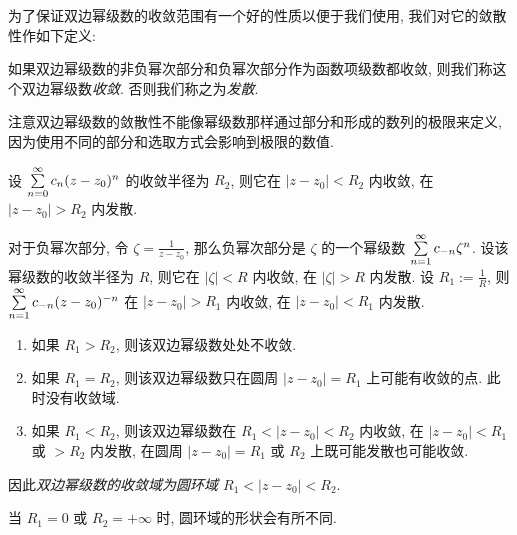 \documentclass[nocolor,theme=doremi,lang=cn,11pt,chinese,twoside,openright,usesamecnt]{elegantbook}
\begin{document}
为了保证双边幂级数的收敛范围有一个好的性质以便于我们使用, 我们对它的敛散性作如下定义:
\begin{definition}
	如果双边幂级数的非负幂次部分和负幂次部分作为函数项级数都收敛, 则我们称这个双边幂级数\emph{收敛}. 否则我们称之为\emph{发散}.
\end{definition}

注意双边幂级数的敛散性不能像幂级数那样通过部分和形成的数列的极限来定义,
因为使用不同的部分和选取方式会影响到极限的数值.

设 $\sum\limits_{n=0}^\infty c_n(z-z_0)^n$ 的收敛半径为 $R_2$, 则它在 $|z-z_0|<R_2$ 内收敛, 在 $|z-z_0|>R_2$ 内发散.

对于负幂次部分, 令 $\zeta=\frac1{z-z_0}$, 那么负幂次部分是 $\zeta$ 的一个幂级数 $\sum\limits_{n=1}^\infty c_{-n}\zeta^n$.
设该幂级数的收敛半径为 $R$, 则它在 $|\zeta|<R$ 内收敛, 在 $|\zeta|>R$ 内发散.
设 $R_1:=\frac1R$, 则 $\sum\limits_{n=1}^\infty c_{-n}(z-z_0)^{-n}$ 在 $|z-z_0|>R_1$ 内收敛, 在 $|z-z_0|<R_1$ 内发散.

\begin{enumerate}
	\item 如果 $R_1>R_2$, 则该双边幂级数处处不收敛.
	\item 如果 $R_1=R_2$, 则该双边幂级数只在圆周 $|z-z_0|=R_1$ 上可能有收敛的点.
		此时没有收敛域.
	\item 如果 $R_1<R_2$, 则该双边幂级数在 $R_1<|z-z_0|<R_2$ 内收敛, 在 $|z-z_0|<R_1$ 或 $>R_2$ 内发散, 在圆周 $|z-z_0|=R_1$ 或 $R_2$ 上既可能发散也可能收敛.
\end{enumerate}

因此\emph{双边幂级数的收敛域为圆环域 $R_1<|z-z_0|<R_2$}.

当 $R_1=0$ 或 $R_2=+\infty$ 时, 圆环域的形状会有所不同.
\begin{center}
\end{center}
\end{document}
